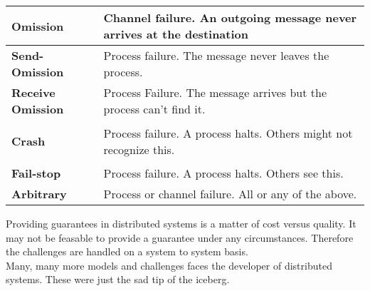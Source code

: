 \pagebreak
 \label{tab:title}
\begin{tabular}{L{1.0in} L{3.45in} }    %
\toprule[1.5pt] %

\textbf{Omission} & Channel failure. An outgoing message never arrives at the destination \\\midrule
 
\textbf{Send-Omission} & Process failure. The message never leaves the process.\\\midrule
 
\textbf{Receive Omission} & Process Failure. The message arrives but the process can't find it.\\\midrule\textsl{}
 
\textbf{Crash} & Process failure. A process halts. Others might not recognize this.\\\midrule
 
\textbf{Fail-stop} & Process failure. A process halts. Others see this.\\\midrule
 
\textbf{Arbitrary} &  Process or channel failure. All or any of the above.\\

\bottomrule[1.25pt] %
\end {tabular}\par
\bigskip

Providing guarantees in distributed systems is a matter of cost versus quality. It may not be feasable to provide a guarantee under any circumstances. Therefore the challenges are handled on a system to system basis.\\ 

Many, many more models and challenges faces the developer of distributed systems. These were just the sad tip of the iceberg.
